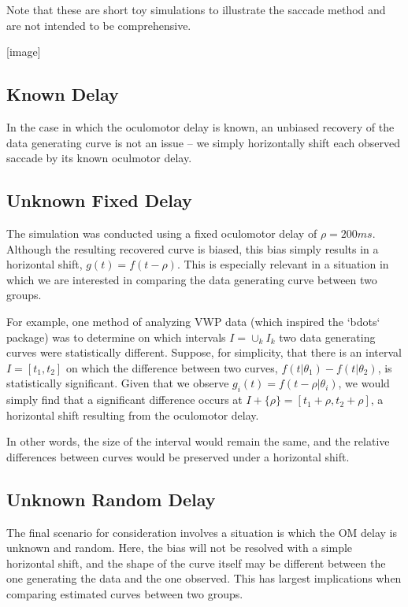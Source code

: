 \documentclass{article}
\begin{document}
Note that these are short toy simulations to illustrate the saccade method and are not intended to be comprehensive. 

[image]

\subsection{Known Delay}


In the case in which the oculomotor delay is known, an unbiased recovery of the data generating curve is not an issue -- we simply horizontally shift each observed saccade by its known oculmotor delay.


\subsection{Unknown Fixed Delay}


The simulation was conducted using a fixed oculomotor delay of $\rho = 200ms$. Although the resulting recovered curve is biased, this bias simply results in a horizontal shift, $g(t) = f(t - \rho)$. This is especially relevant in a situation in which we are interested in comparing the data generating curve between two groups. 

For example, one method of analyzing VWP data (which inspired the `bdots` package) was to determine on which intervals $I = \cup_{k} I_k$ two data generating curves were statistically different. Suppose, for simplicity, that there is an interval $I = [t_1, t_2]$ on which the difference between two curves, $f(t | \theta_1) - f(t|\theta_2)$, is statistically significant. Given that we observe $g_i(t) = f(t - \rho | \theta_i)$, we would simply find that a significant difference occurs at $I + \{\rho\} = [t_1 + \rho, t_2 + \rho]$, a horizontal shift resulting from the oculomotor delay.

In other words, the size of the interval would remain the same, and the relative differences between curves would be preserved under a horizontal shift. 

\subsection{Unknown Random Delay}


The final scenario for consideration involves a situation is which the OM delay is unknown and random. Here, the bias will not be resolved with a simple horizontal shift, and the shape of the curve itself may be different between the one generating the data and the one observed. This has largest implications when comparing estimated curves between two groups.
\end{document}
